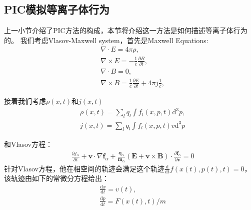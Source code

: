 \subsection[\textnormal{PIC模拟等离子体行为}]{\textbf{PIC模拟等离子体行为}}

上一小节介绍了PIC方法的构成，本节将介绍这一方法是如何描述等离子体行为的\cite{Qin_2015}。
我们考虑Vlasov-Maxwell system\cite{Pohl_2020}，首先是Maxwell Equations: 
\begin{equation}
    \begin{aligned}
        &\displaystyle\nabla\cdot E=4\pi\rho ,\\
        &\displaystyle\nabla\times E=-\frac{1}{c}\frac{\partial B}{\partial t} ,\\
        &\displaystyle\nabla\cdot B=0 ,\\
        &\displaystyle\nabla\times B=\frac{1}{c}\frac{\partial E}{\partial t}+4\pi j\frac{1}{c} ,
    \end{aligned}
\end{equation}

接着我们考虑$\rho(x,t)$和$j(x,t)$
\begin{equation}
    \begin{aligned}
        &\displaystyle\rho(x,t) = \sum_l q_l\int f_l(x,p,t)\mathrm{d^3}p, \\
        &\displaystyle j(x,t) = \sum_l q_l\int f_l(x,p,t)v\mathrm{d^3}p
    \end{aligned}
\end{equation}

和Vlasov方程\cite{RevModPhys.55.403}：
\begin{equation}
    \begin{aligned}
        & \displaystyle \frac{\partial f_\alpha}{\partial t}+\mathbf{v}\cdot\nabla\mathbf{f}_\alpha+\frac{\mathbf{q}_\alpha}{\mathbf{m}_\alpha}\left(\mathbf{E}+\mathbf{v}\times\mathbf{B}\right)\cdot\frac{\partial\mathbf{f}_\alpha}{\partial\mathbf{v}}=0
    \end{aligned}
\end{equation}
针对Vlasov方程，他在相空间的轨迹会满足这个轨迹$\displaystyle \frac{\mathrm{d}}{\mathrm{d}t}f(x(t),p(t),t) = 0$，
该轨迹由如下的常微分方程给出：
\begin{equation}
    \begin{aligned}
        &\displaystyle\frac{\mathrm{d}x}{\mathrm{d}t} = v(t), \\
        &\displaystyle\frac{\mathrm{d}p}{\mathrm{d}t} = F(x(t),t)/m
    \end{aligned}
\end{equation}

